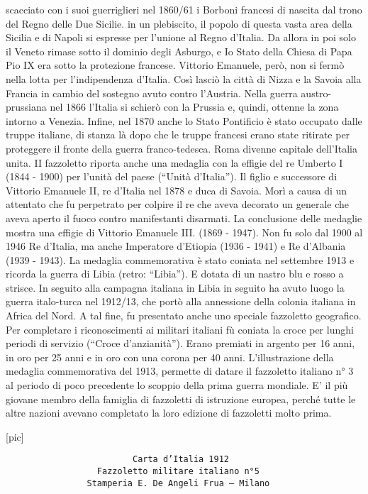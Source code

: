 scacciato con i suoi guerriglieri nel 1860/61 i Borboni francesi di
nascita dal trono del Regno delle Due Sicilie. in un plebiscito, il
popolo di questa vasta area della Sicilia e di Napoli si espresse per
l'unione al Regno d'Italia. Da allora in poi solo il Veneto rimase sotto
il dominio degli Asburgo, e Io Stato della Chiesa di Papa Pio IX era
sotto la protezione francese. Vittorio Emanuele, però, non si fermò
nella lotta per l'indipendenza d'Italia. Così lasciò la città di Nizza e
la Savoia alla Francia in cambio del sostegno avuto contro l'Austria.
Nella guerra austro- prussiana nel 1866 l'Italia si schierò con la
Prussia e, quindi, ottenne la zona intorno a Venezia. Infine, nel 1870
anche lo Stato Pontificio è stato occupato dalle truppe italiane, di
stanza là dopo che le truppe francesi erano state ritirate per
proteggere il fronte della guerra franco-tedesca. Roma divenne capitale
dell'Italia unita. II fazzoletto riporta anche una medaglia con la
effigie del re Umberto I (1844 - 1900) per l'unità del paese (``Unità
d'Italia''). Il figlio e successore di Vittorio Emanuele II, re d'Italia
nel 1878 e duca di Savoia. Morì a causa di un attentato che fu
perpetrato per colpire il re che aveva decorato un generale che aveva
aperto il fuoco contro manifestanti disarmati. La conclusione delle
medaglie mostra una effigie di Vittorio Emanuele III. (1869 - 1947). Non
fu solo dal 1900 al 1946 Re d'Italia, ma anche Imperatore d'Etiopia
(1936 - 1941) e Re d'Albania (1939 - 1943). La medaglia commemorativa è
stato coniata nel settembre 1913 e ricorda la guerra di Libia (retro:
``Libia''). E dotata di un nastro blu e rosso a strisce. In seguito alla
campagna italiana in Libia in seguito ha avuto luogo la guerra
italo-turca nel 1912/13, che portò alla annessione della colonia
italiana in Africa del Nord. A tal fine, fu presentato anche uno
speciale fazzoletto geografico. Per completare i riconoscimenti ai
militari italiani fù coniata la croce per lunghi periodi di servizio
(``Croce d'anzianità''). Erano premiati in argento per 16 anni, in oro
per 25 anni e in oro con una corona per 40 anni. L'illustrazione della
medaglia commemorativa del 1913, permette di datare il fazzoletto
italiano n° 3 al periodo di poco precedente lo scoppio della prima
guerra mondiale. E' il più giovane membro della famiglia di fazzoletti
di istruzione europea, perché tutte le altre nazioni avevano completato
la loro edizione di fazzoletti molto prima.

{[}pic{]}

\begin{verbatim}
                         Carta d’Italia 1912
                  Fazzoletto militare italiano n°5
                Stamperia E. De Angeli Frua – Milano
\end{verbatim}

